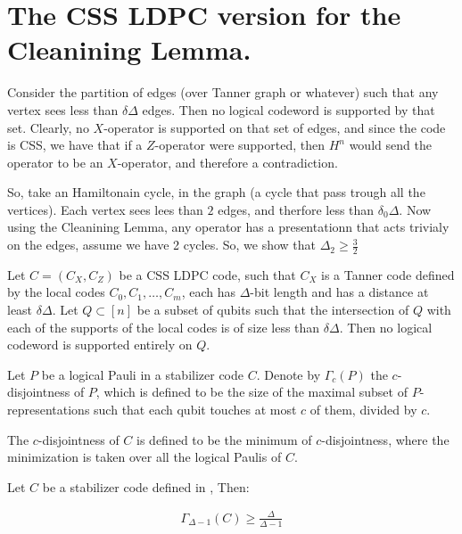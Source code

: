 \documentclass[manuscript,screen,review]{acmart}
\begin{document}
{  \section{The CSS LDPC version for the Cleanining Lemma.}
Consider the partition of edges (over Tanner graph or whatever) such that any vertex sees less than $\delta \Delta$ edges. Then no logical codeword is supported by that set. Clearly, no $X$-operator is supported on that set of edges, and since the code is CSS, we have that if a $Z$-operator were supported, then $H^n$ would send the operator to be an $X$-operator, and therefore a contradiction.

So, take an Hamiltonain cycle, in the graph (a cycle that pass trough all the vertices). Each vertex sees lees than $2$ edges, and therfore less than $\delta_{0}\Delta$. Now using the Cleanining Lemma, any operator has a presentationn that acts trivialy on the edges, assume we have 2 cycles. 
So, we show that $\Delta_{2} \ge \frac{3}{2}$

\begin{claim}
  \label{claim:cssstab}
Let $C = \left( C_{X}, C_{Z} \right)$ be a CSS LDPC code, such that $C_{X}$ is a Tanner code defined by the local codes $C_{0}, C_{1}, \ldots, C_{m}$, each has $\Delta$-bit length and has a distance at least $\delta \Delta$. Let $Q \subset [n]$ be a subset of qubits such that the intersection of $Q$ with each of the supports of the local codes is of size less than $\delta \Delta$. Then no logical codeword is supported entirely on $Q$.
\end{claim}


\cite{Bravyi_2009}\cite{cleaning_lemm_2}

\begin{definition}
Let $P$ be a logical Pauli in a stabilizer code $C$. Denote by $\Gamma_{c}(P)$ the $c$-disjointness of $P$, which is defined to be the size of the maximal subset of $P$-representations such that each qubit touches at most $c$ of them, divided by $c$. 


The $c$-disjointness of $C$ is defined to be the minimum of $c$-disjointness, where the minimization is taken over all the logical Paulis of $C$.
\end{definition}

\begin{claim}
  Let $C$ be a stabilizer code defined in , Then:


  \begin{equation*}
    \begin{split}
  \Gamma_{ \Delta - 1 }\left( C \right) \ge \frac{ \Delta }{  \Delta  - 1   }
    \end{split}
  \end{equation*}
\end{claim}



}
\end{document}

